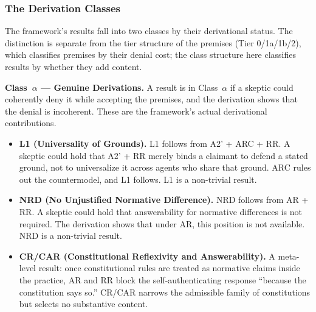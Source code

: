 \documentclass[11pt]{article}
\def\ensuremath#1{#1}%
\def\mathrm#1{#1}%
\newcommand{\Atwo}{\texorpdfstring{\ensuremath{\mathrm{A2}'}}{A2'}}
\newcommand{\ca}{\texorpdfstring{Class~$\alpha$}{Class alpha}}
\begin{document}
\subsubsection{The Derivation Classes}
The framework's results fall into two classes by their derivational status. The distinction is separate from the tier structure of the premises (Tier 0/1a/1b/2), which classifies premises by their denial cost; the class structure here classifies results by whether they add content.
\begin{paperbox}
\textbf{\ca{} --- Genuine Derivations.} A result is in \ca{} if a skeptic could coherently deny it while accepting the premises, and the derivation shows that the denial is incoherent. These are the framework's actual derivational contributions.
\begin{itemize}
\item \textbf{L1 (Universality of Grounds).} L1 follows from \Atwo{} + ARC + RR. A skeptic could hold that \Atwo{} + RR merely binds a claimant to defend a stated ground, not to universalize it across agents who share that ground. ARC rules out the countermodel, and L1 follows. L1 is a non-trivial result.
\item \textbf{NRD (No Unjustified Normative Difference).} NRD follows from AR + RR. A skeptic could hold that answerability for normative differences is not required. The derivation shows that under AR, this position is not available. NRD is a non-trivial result.
\item \textbf{CR/CAR (Constitutional Reflexivity and Answerability).} A meta-level result: once constitutional rules are treated as normative claims inside the practice, AR and RR block the self-authenticating response ``because the constitution says so.'' CR/CAR narrows the admissible family of constitutions but selects no substantive content.
\end{itemize}
\end{paperbox}
\end{document}
